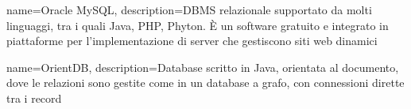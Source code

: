 {
	name=Oracle MySQL,
	description={DBMS relazionale supportato da molti linguaggi, tra i quali Java, PHP, Phyton. \MakeUppercase{è} un software gratuito e integrato in piattaforme per l'implementazione di server che gestiscono siti web dinamici}
}

{
	name=OrientDB,
	description={Database scritto in Java, orientata al documento, dove le relazioni sono gestite come in un database a grafo, con connessioni dirette tra i record}
}

